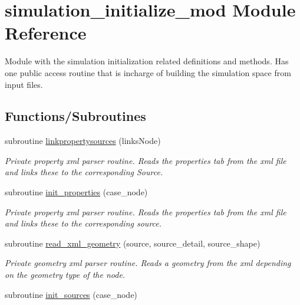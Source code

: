 \hypertarget{namespacesimulation__initialize__mod}{}\section{simulation\+\_\+initialize\+\_\+mod Module Reference}
\label{namespacesimulation__initialize__mod}


Module with the simulation initialization related definitions and methods. Has one public access routine that is incharge of building the simulation space from input files.  


\subsection*{Functions/\+Subroutines}
\begin{DoxyCompactItemize}
\item 
subroutine \mbox{\hyperlink{namespacesimulation__initialize__mod_a695ed61242e902d50bc40b83a6d11f65}{linkpropertysources}} (links\+Node)
\begin{DoxyCompactList}\small\item\em Private property xml parser routine. Reads the properties tab from the xml file and links these to the corresponding Source. \end{DoxyCompactList}\item 
subroutine \mbox{\hyperlink{namespacesimulation__initialize__mod_a7b30af4cf1a6ee74a4b2c6e8c9d1d98d}{init\+\_\+properties}} (case\+\_\+node)
\begin{DoxyCompactList}\small\item\em Private property xml parser routine. Reads the properties tab from the xml file and links these to the corresponding source. \end{DoxyCompactList}\item 
subroutine \mbox{\hyperlink{namespacesimulation__initialize__mod_ab6e350f9f537c9f62e8ba5aeb023d2a6}{read\+\_\+xml\+\_\+geometry}} (source, source\+\_\+detail, source\+\_\+shape)
\begin{DoxyCompactList}\small\item\em Private geometry xml parser routine. Reads a geometry from the xml depending on the geometry type of the node. \end{DoxyCompactList}\item 
subroutine \mbox{\hyperlink{namespacesimulation__initialize__mod_ae89df4e3074d9624a7db2bc015545d8d}{init\+\_\+sources}} (case\+\_\+node)

\end{DoxyCompactItemize}

